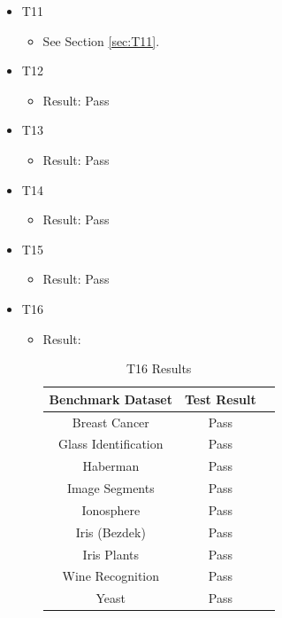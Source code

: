\documentclass[12pt, titlepage]{article}
\begin{document}
\begin{itemize}
\begin{itemize}
    \end{itemize}
    \item T11
    \begin{itemize}
    \item See Section \ref{sec:T11}.
    \end{itemize}
    \item T12
    \begin{itemize}
    \item Result: Pass
    \end{itemize}
    \item T13
    \begin{itemize}
    \item Result: Pass
    \end{itemize}
    \item T14
    \begin{itemize}
    \item Result: Pass
    \end{itemize}
    \item T15
    \begin{itemize}
    \item Result: Pass
    \end{itemize}
    \item T16
    \begin{itemize}
    \item Result: 
        \begin{table}[H]
        \centering
        \begin{tabular}{|c|c|c|}
        \hline
        Benchmark Dataset & Test Result \\ \hline
        Breast Cancer & Pass \\ \hline
        Glass Identification & Pass \\ \hline
        Haberman  &  Pass\\ \hline
        Image Segments &  Pass \\ \hline
        Ionosphere & Pass  \\ \hline
        Iris (Bezdek) &  Pass \\ \hline
        Iris Plants &  Pass \\ \hline
        Wine Recognition &  Pass \\ \hline
        Yeast &  Pass \\ \hline
        \end{tabular}
        \caption{T16 Results}
        \label{Table:T16}
        \end{table}
    \end{itemize}
\end{itemize}
\end{document}

